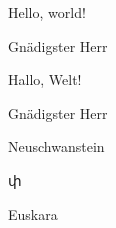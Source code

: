 \documentclass{minimal}
\def\gnaeherr{%
\begin{minipage}{1sp}
Gnädigster Herr
\end{minipage}%
}
\begin{document}
Hello, world!

\gnaeherr

\showthe\language
\begin{german}
Hallo, Welt!

\gnaeherr

\begin{minipage}{1sp}
\showthe\language
Neuschwanstein
\end{minipage}
\end{german}


\begin{armenian}
\showthe\language
փ
\end{armenian}

\begin{basque}
\showthe\language
Euskara
\end{basque}
\end{document}
